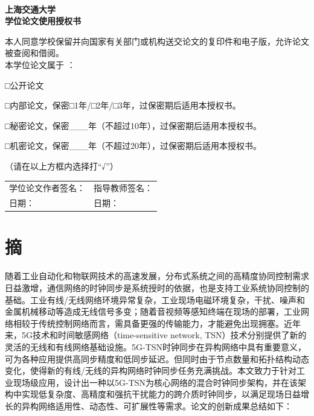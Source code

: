 \documentclass[UTF8,a4paper,12pt]{ctexart}
\numberwithin{equation}{section}
\begin{document}
	~\\
	\begin{center}
		\heiti {}\textbf{
			上海交通大学\\
			学位论文使用授权书}
	\end{center}
	
	本人同意学校保留并向国家有关部门或机构送交论文的复印件和电子版，允许论文被查阅和借阅。\\
	本学位论文属于 ：\par
	□公开论文\par
	□内部论文，保密□1年/□2年/□3年，过保密期后适用本授权书。\par
	□秘密论文，保密\_\_\_年（不超过10年），过保密期后适用本授权书。\par
	□机密论文，保密\_\_\_年（不超过20年），过保密期后适用本授权书。\par
	（请在以上方框内选择打“√”）\\
	
	\begin{flushright}
		\begin{tabular}{l l}
			学位论文作者签名：\hspace{10mm}\qquad \hspace{100mm}&指导教师签名：\qquad\\
			日期： &日期：\\
		\end{tabular}
	\end{flushright}
	
	\newpage
	
	\section*{摘}
	
	
	随着工业自动化和物联网技术的高速发展，分布式系统之间的高精度协同控制需求日益激增，通信网络的时钟同步是系统授时的依据，也是支持工业系统协同控制的基础。工业有线/无线网络环境异常复杂，工业现场电磁环境复杂，干扰、噪声和金属机械移动等造成无线信号多变；随着音视频等感知终端在现场的部署，工业网络相较于传统控制网络而言，需具备更强的传输能力，才能避免出现拥塞。近年来，5G技术和时间敏感网络（time-sensitive network, TSN）技术分别提供了新的灵活的无线和有线网络基础设施。5G-TSN时钟同步在异构网络中具有重要意义，可为各种应用提供高同步精度和低同步延迟。但同时由于节点数量和拓扑结构动态变化，使得新的有线/无线的异构网络时钟同步任务充满挑战。本文致力于针对工业现场级应用，设计出一种以5G-TSN为核心网络的混合时钟同步架构，并在该架构中实现低复杂度、高精度和强抗干扰能力的跨介质时钟同步，以满足现场日益增长的异构网络适用性、动态性、可扩展性等需求。论文的创新成果总结如下：
	
\end{document}
